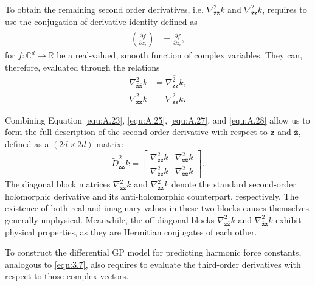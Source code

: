 To obtain the remaining second order derivatives, i.e. \(\nabla^{2}_{\overline{\mathbf{z}}\overline{\mathbf{z}}}k\) and \(\nabla^{2}_{\overline{\mathbf{z}}\mathbf{z}}k\), requires to use the conjugation of derivative identity defined as
\begin{align} \label{equ:A.26} 
\overline{ \left( \frac{\partial f}{\partial z_i} \right) } &= \frac{\partial f}{\partial \overline{z}_i}, 
\end{align}
for \( f: \mathbb{C}^d \rightarrow \mathbb{R} \) be a real-valued, smooth function of complex variables.
They can, therefore, evaluated through the relations
\begin{align} 
 \nabla^{2}_{\overline{\mathbf{z}}\overline{\mathbf{z}}}k &= \overline{\nabla^{2}_{\mathbf{z}\mathbf{z}}k}, \label{equ:A.27}\\ 
 \nabla^{2}_{\overline{\mathbf{z}}\mathbf{z}}k &= \overline{\nabla^{2}_{\mathbf{z}\overline{\mathbf{z}}}k}. \label{equ:A.28}
\end{align}

Combining Equation \eqref{equ:A.23}, \eqref{equ:A.25}, \eqref{equ:A.27}, and \eqref{equ:A.28} allow us to form the full description of the second order derivative with respect to \(\mathbf{z}\) and \(\overline{\mathbf{z}}\), defined as a $(2d\times 2d)$-matrix:
\begin{equation} \label{equ:A.29}
    \tilde{D}^{2}_{\mathbf{z}\mathbf{z}}k=
    \begin{bmatrix}
       \nabla^{2}_{\mathbf{z}\mathbf{z}}k & \nabla^{2}_{\mathbf{z}\overline{\mathbf{z}}}k
        \\
        \nabla^{2}_{\overline{\mathbf{z}}\mathbf{z}}k & \nabla^{2}_{\overline{\mathbf{z}}\overline{\mathbf{z}}}k
    \end{bmatrix}.
\end{equation}
The diagonal block matrices $\nabla^{2}_{\mathbf{z}\mathbf{z}}k$ and $\nabla^{2}_{\overline{\mathbf{z}}\overline{\mathbf{z}}}k$ denote the standard second-order holomorphic derivative and its anti-holomorphic counterpart, respectively. 
The existence of both real and imaginary values in these two blocks causes themselves generally unphysical.
Meanwhile, the off-diagonal blocks $\nabla^{2}_{\mathbf{z}\overline{\mathbf{z}}}k$ and $ \nabla^{2}_{\overline{\mathbf{z}}\mathbf{z}}k$ exhibit physical properties, as they are Hermitian conjugates of each other.

To construct the differential GP model for predicting harmonic force constants, analogous to \eqref{equ:3.7}, also requires to evaluate the third-order derivatives with respect to those complex vectors.

